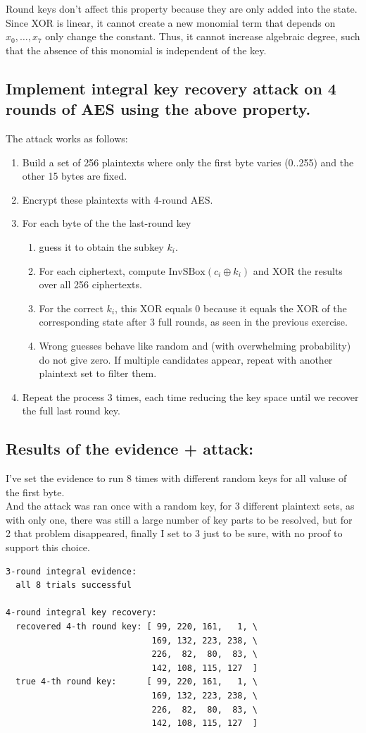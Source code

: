 \documentclass{article}
\begin{document}
Round keys don't affect this property because they are only added into the state. Since XOR is linear, it cannot create a new monomial term that depends on $x_0,\dots,x_7$ only change the constant. Thus, it cannot increase algebraic degree, such that the absence of this monomial is independent of the key.



\subsection{Implement integral key recovery attack on 4 rounds of AES using the above property.}
The attack works as follows:
\begin{enumerate}
    \item Build a set of 256 plaintexts where only the first byte varies (0..255) and the other 15 bytes are fixed.
    \item Encrypt these plaintexts with 4-round AES.
    \item For each byte of the the last-round key \begin{enumerate}
        \item guess it to obtain the subkey $k_i$.
        \item For each ciphertext, compute $\text{InvSBox}(c_i \oplus k_i)$ and XOR the results over all 256 ciphertexts.
        \item For the correct $k_i$, this XOR equals 0 because it equals the XOR of the corresponding state after 3 full rounds, as seen in the previous exercise.
        \item Wrong guesses behave like random and (with overwhelming probability) do not give zero. If multiple candidates appear, repeat with another plaintext set to filter them.
    \end{enumerate}
    \item Repeat the process 3 times, each time reducing the key space until we recover the full last round key.
\end{enumerate}

\subsection{Results of the evidence + attack:}
I've set the evidence to run 8 times with different random keys for all valuse of the first byte.\\
And the attack was ran once with a random key, for 3 different plaintext sets, as with only one, there was still a large number of key parts to be resolved, but for 2 that problem disappeared, finally I set to 3 just to be sure, with no proof to support this choice.
\begin{lstlisting}[language=text]
3-round integral evidence:
  all 8 trials successful

4-round integral key recovery:
  recovered 4-th round key: [ 99, 220, 161,   1, \
                             169, 132, 223, 238, \
                             226,  82,  80,  83, \
                             142, 108, 115, 127  ]
  true 4-th round key:      [ 99, 220, 161,   1, \
                             169, 132, 223, 238, \ 
                             226,  82,  80,  83, \
                             142, 108, 115, 127  ]
\end{lstlisting}
\end{document}
